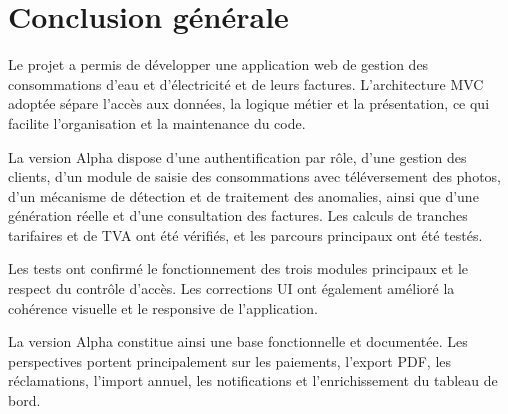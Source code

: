 \section*{Conclusion générale}

Le projet \projectname{} a permis de développer une application web de gestion des consommations d'eau et d'électricité et de leurs factures. L'architecture MVC adoptée sépare l'accès aux données, la logique métier et la présentation, ce qui facilite l'organisation et la maintenance du code.

La version Alpha dispose d'une authentification par rôle, d'une gestion des clients, d'un module de saisie des consommations avec téléversement des photos, d'un mécanisme de détection et de traitement des anomalies, ainsi que d'une génération réelle et d'une consultation des factures. Les calculs de tranches tarifaires et de TVA ont été vérifiés, et les parcours principaux ont été testés.

Les tests ont confirmé le fonctionnement des trois modules principaux et le respect du contrôle d'accès. Les corrections UI ont également amélioré la cohérence visuelle et le responsive de l'application.

La version Alpha constitue ainsi une base fonctionnelle et documentée. Les perspectives portent principalement sur les paiements, l'export PDF, les réclamations, l'import annuel, les notifications et l'enrichissement du tableau de bord.

\clearpage
